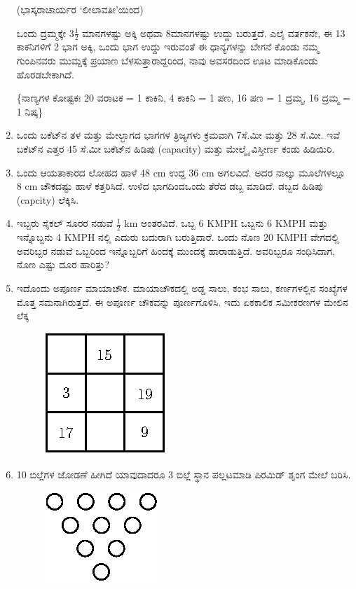 \begin{enumerate}
\smallskip

\hfill{(ಭಾಸ್ಕರಾಚಾರ್ಯರ `ಲೀಲಾವತೀ'ಯಿಂದ)}

\smallskip

ಒಂದು ದ್ರಮ್ಮಕ್ಕೇ $3\frac{1}{2}$ ಮಾನಗಳಷ್ಟು ಅಕ್ಕಿ ಅಥವಾ 8ಮಾನಗಳಷ್ಟು ಉದ್ದು ಬರುತ್ತದೆ. ಎಲೈ ವರ್ತಕನೇ, ಈ 13 ಕಾಕನಿಗಳಿಗೆ 2 ಭಾಗ ಅಕ್ಕಿ, ಒಂದು ಭಾಗ ಉದ್ದು ಇರುವಂತೆ ಈ ಧಾನ್ಯಗಳನ್ನು ಬೇಗನೆ ಕೊಂಡು ನಮ್ಮ ಗುಂಪಿನವರು ಮುಮ್ದಕ್ಕೆ ಪ್ರಯಾಣ ಬೆಳಸುತ್ತಾರಾದ್ದರಿಂದ, ನಾವು ಅವಸರದಿಂದ ಊಟ ಮಾಡಿಕೊಂಡು ಹೊರಡಬೇಕಾಗಿದೆ. 

\{ನಾಣ್ಯಗಳ ಕೋಷ್ಟಕಃ 20 ವರಾಟಕ = 1 ಕಾಕಿನಿ, 4 ಕಾಕಿನಿ  = 1 ಪಣ, 16 ಪಣ = 1 ದ್ರಮ್ಮ, 16 ದ್ರಮ್ಮ  = 1 ನಿಷ್ಕ\}  

\item ಒಂದು ಬಕೆಟ್‌ನ ತಳ ಮತ್ತು ಮೇಲ್ಭಾಗದ ಭಾಗಗಳ ತ್ರಿಜ್ಯಗಳು ಕ್ರಮವಾಗಿ 7ಸೆ.ಮೀ ಮತ್ತು 28 ಸೆ.ಮೀ. ಇವೆ ಬಕೆಟ್‌ನ ಎತ್ತರ 45 ಸೆ.ಮೀ ಬಕೆಟ್‌ನ ಹಿಡಿಪು (capacity) ಮತ್ತು ಮೇಲ್ಮೈ ವಿಸ್ತೀರ್ಣ ಕಂಡು ಹಿಡಿಯಿರಿ. 

\item ಒಂದು ಆಯತಾಕಾರದ ಲೋಹದ ಹಾಳೆ 48 cm ಉದ್ದ 36 cm ಅಗಲವಿದೆ. ಅದರ ನಾಲ್ಕು ಮೂಲೆಗಳಲ್ಲೂ 8 cm ಚೌಕದಷ್ಟು ಹಾಳೆ ಕತ್ತರಿಸಿದೆ. ಉಳಿದ ಭಾಗದಿಂದ\break ಒಂದು ತೆರೆದ ಡಬ್ಬ ಮಾಡಿದೆ. ಡಬ್ಬದ ಹಿಡಿಪು (capcity) ಲೆಕ್ಕಿಸಿ. 

\item ಇಬ್ಬರು ಸೈಕಲ್ ಸೂರರ ನಡುವೆ $\frac{1}{2}$ km ಅಂತರವಿದೆ. ಒಬ್ಬ 6 KMPH ಒಬ್ಬನು 6 KMPH ಮತ್ತು ಇನ್ನೊಬ್ಬನು 4 KMPH ನಲ್ಲಿ ಎದುರು ಬದುರಾಗಿ ಬರುತ್ತಿದಾರೆ. ಒಂದು ನೊಣ 20 KMPH ವೇಗದಲ್ಲಿ ಅವರಿಬ್ಬರ ನಡುವೆ ಒಬ್ಬರಿಂದ ಇನ್ನೊಬ್ಬರಿಗೆ ಹಿಂದಕ್ಕೆ ಮುಂದಕ್ಕೆ ಹಾರಾಡುತ್ತಿದೆ. ಅವರಿಬ್ಬರೂ ಸಂಧಿಸಿದಾಗ, ನೊಣ ಎಷ್ಟು ದೂರ ಹಾರಿತ್ತು? 

\item ಇದೊಂದು ಅಪೂರ್ಣ ಮಾಯಾಚೌಕ. ಮಾಯಾಚೌಕದಲ್ಲಿ ಅಡ್ಡ ಸಾಲು, ಕಂಭ ಸಾಲು, ಕರ್ಣಗಳಲ್ಲಿನ ಸಂಖ್ಯೆಗಳ ಮೊತ್ತ ಸಮನಾಗಿರುತ್ತದೆ. ಈ ಅಪೂರ್ಣ ಚೌಕವನ್ನು ಪೂರ್ಣಗೊಳಿಸಿ. ಇದು ಏಕಕಾಲಿಕ ಸಮೀಕರಣಗಳ ಮೇಲಿನ ಲೆಕ್ಕ 
\begin{figure}[H]
\centering
\includegraphics[scale=1.2]{images/chap10/q26.eps}
\end{figure}
 
\item 10 ಬಿಲ್ಲೆಗಳ ಜೋಡಣೆ ಹೀಗಿದೆ ಯಾವುದಾದರೂ 3 ಬಿಲ್ಲೆ ಸ್ಥಾನ ಪಲ್ಲಟಮಾಡಿ ಪಿರಮಿಡ್ ಶೃಂಗ ಮೇಲೆ ಬರಿಸಿ. 
\begin{figure}[H]
\centering
\includegraphics[scale=1.2]{images/chap10/q27.eps}
\end{figure}


\end{enumerate}
